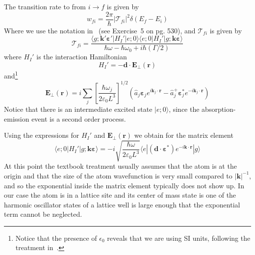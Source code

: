 \documentclass[11pt,letter]{article}
\newcommand{\bv}[1]{\ensuremath{\bm{#1}}}
\begin{document}
The transition rate to from $i\rightarrow f$ is given by 
\begin{equation}
    \label{eq:transitionRate}
    w_{fi} = \frac{2\pi}{\hbar} | \mathcal{T}_{fi} |^{2} \delta(E_{f}-E_{i})
\end{equation}
Where we use the notation in~\cite{cohen1998atom} (see Exercise~5 on pg. 530),
and $\mathcal{T}_{fi}$ is given by
\begin{equation}
    \mathcal{T}_{fi} = \frac{  
        \langle g; \bv{k}'\bv{\varepsilon}'| H_{I}' | e; 0 \rangle 
        \langle e; 0 | H_{I}' | g; \bv{k}\bv{\varepsilon} \rangle }
        { \hbar\omega - \hbar\omega_{0} + i\hbar (\Gamma/2 ) }
\end{equation} 
where $H_{I}'$ is the interaction Hamiltonian
\begin{equation}
    H_{I}' = -\bv{d} \cdot \bv{E}_{\perp} ( \bv{r} ) 
\end{equation}
and\footnote{Notice that the presence of $\epsilon_{0}$ reveals that we are
using SI units, following the treatment in~\cite{cohen1998atom}.}
\begin{equation}
    \bv{E}_{\perp}(\bv{r}) = i \sum_{j} 
        \left[ \frac{ \hbar \omega_{j} }{ 2\varepsilon_{0} L^{3}}  \right]^{1/2}
        \left( \hat{a}_{j}\bv{\varepsilon}_{j} e^{i\bv{k}_{j}\cdot\bv{r}} 
              - \hat{a}_{j}^{+}\bv{\varepsilon}_{j}^{*} e^{-i\bv{k}_{j}
                \cdot\bv{r}} 
        \right)
\end{equation}
Notice that there is an intermediate excited state $|e;0\rangle$, since the
absorption-emission event is a second order process.

Using the expressions for $H_{I}'$ and $\bv{E}_{\perp}(\bv{r})$ we obtain for
the matrix element 
\begin{equation}
   \langle e; 0 | H_{I}' | g; \bv{k}\bv{\varepsilon} \rangle = 
       -i \sqrt{ \frac{ \hbar \omega }{2 \varepsilon_{0} L^{3} }} 
      \langle e | (\bv{d} \cdot \bv{\varepsilon}^{*} ) 
       e^{-i\bv{k}\cdot\bv{r}}| g \rangle
\end{equation}
At this point the textbook treatment usually assumes that the atom is at the
origin and that the size of the atom wavefunction is very small compared to
$|\bv{k}|^{-1}$, and so the exponential inside the matrix element typically
does not show up.  In our case the atom is in a lattice site and its center of
mass state is one of the harmonic oscillator states of a lattice well is large
enough that the exponential term cannot be neglected.  
 
\end{document}

